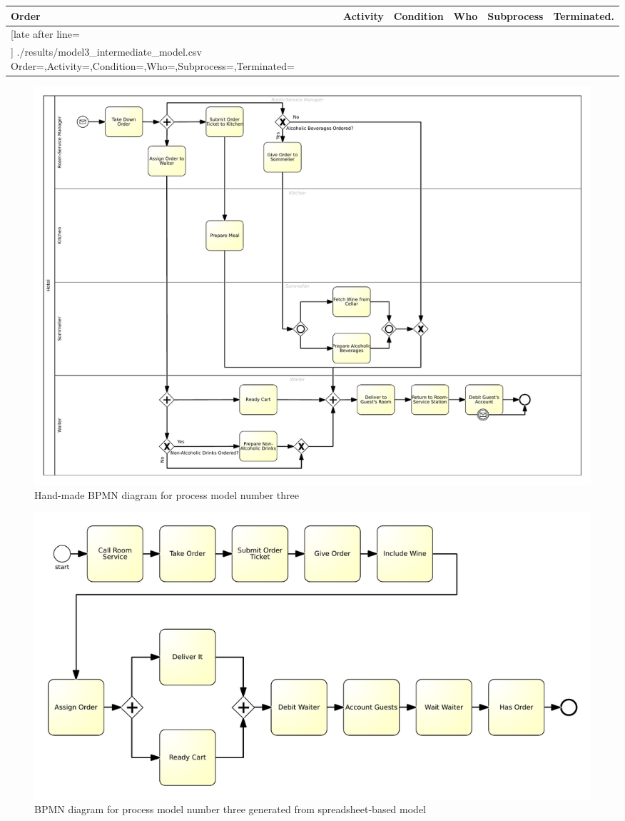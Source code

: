 {\scriptsize
	\begin{longtable}{|p{0.03 \hsize}|p{0.25 \hsize}|p{0.15 \hsize}|p{0.2 \hsize}|p{0.1 \hsize}|p{0.1 \hsize}|}
		\hline
		Order & Activity & Condition & Who & Subprocess & Terminated.
		\\\hline\hline
		\csvreader[late after line=\\\hline]
		{./results/model3_intermediate_model.csv}
		{Order=\Order,Activity=\Activity,Condition=\Condition,Who=\Who,Subprocess=\Subprocess,Terminated=\Terminated}
		{\Order & \Activity & \Condition & \Who & \Subprocess & \Terminated}
		\caption{Spreadsheet-based description for process model number three}
		\label{csv:model3_val}
	\end{longtable}
}

\begin{figure}[H]
	\centering
	\includegraphics[width=0.95\textheight, angle=90]{./bpmn/model3.pdf}
	\caption{Hand-made BPMN diagram for process model number three}
	\label{bpmn:model3_val}
\end{figure}

\begin{figure}[H]
	\centering
	\includegraphics[width=\hsize]{./generated_bpmn/model3.pdf}
	\caption{BPMN diagram for process model number three generated from spreadsheet-based model}
	\label{bpmn:generated_model3_val}
\end{figure}

